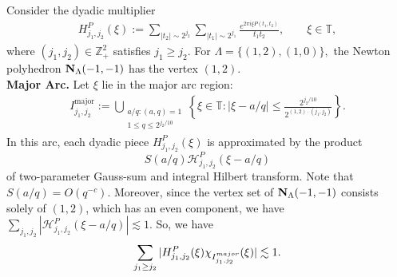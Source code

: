 \documentclass[10pt,a4paper]{amsart}
\numberwithin{equation}{section}
\begin{document}
  Consider  the  dyadic multiplier \begin{align*} H^{P}_{j_1,j_2}(\xi) := \sum_{|t_2|\sim 2^{j_2}} \sum_{|t_1|\sim 2^{j_1}} \frac{e^{2\pi i \xi P(t_1,t_2)}}{t_1t_2}, \qquad \xi\in\mathbb{T}, \end{align*} where $(j_1,j_2)\in\mathbb{Z}_+^2$ satisfies $j_1\geq j_2$. For $\Lambda=\{(1,2),(1,0)\},$ the Newton polyhedron ${\bf N}_{\Lambda}(-1,-1)$ has the vertex $(1,2)$.\\
  
 \noindent\textbf{Major Arc.} Let $\xi$ lie  in the major arc region:
	\begin{align}\label{rt}
			I^{\mathrm{major}}_{j_1,j_2}
		:=
		\bigcup_{\substack{a/q : (a,q)=1 \\ 1\le q \le 2^{j_2/10}}}
		\left\{
		\xi \in \mathbb{T} :
		|\xi - a/q| \le \frac{2^{j_2/10}}{2^{(1,2)\cdot(j_1,j_2)}}
		\right\}.
	\end{align}
	In this arc, each dyadic piece $H_{j_1,j_2}^{P}(\xi)$ is approximated by the product  $$S(a/q)\mathcal{H}^{P}_{j_1,j_2}(\xi-a/q)$$ 
	of two-parameter Gauss-sum  and  integral Hilbert transform. Note that $S(a/q)=O(q^{-c}).$ Moreover, since the vertex set of ${\bf N}_{\Lambda}(-1,-1)$ consists solely of $(1,2)$, which has an even component, we have $\sum_{j_1, j_2} \left| \mathcal{H}^{P}_{j_1,j_2}(\xi-a/q) \right| \lesssim 1.$ So, we have $$ \sum_{j_1\ge j_2} |H^{P}_{j_1,j_2}(\xi)\chi_{I_{j_1,j_2}^{\rm{major}}}(\xi) |\lesssim 1.$$
		
\end{document}
